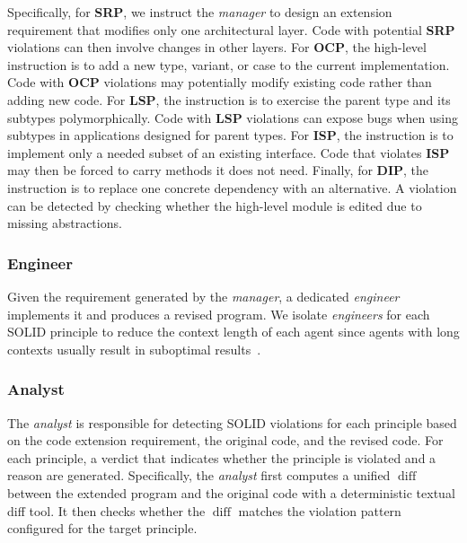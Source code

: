 \documentclass[sigconf,screen]{acmart}
\begin{document}
Specifically, for \textbf{SRP}, we instruct the \textit{manager} to design an extension requirement that modifies only one architectural layer.
Code with potential \textbf{SRP} violations can then involve changes in other layers.
For \textbf{OCP}, the high-level instruction is to add a new type, variant, or case to the current implementation.
Code with \textbf{OCP} violations may potentially modify existing code rather than adding new code.
For \textbf{LSP}, the instruction is to exercise the parent type and its subtypes polymorphically.
Code with \textbf{LSP} violations can expose bugs when using subtypes in applications designed for parent types.
For \textbf{ISP}, the instruction is to implement only a needed subset of an existing interface.
Code that violates \textbf{ISP} may then be forced to carry methods it does not need.
Finally, for \textbf{DIP}, the instruction is to replace one concrete dependency with an alternative.
A violation can be detected by checking whether the high-level module is edited due to missing abstractions.

\subsubsection{Engineer}
Given the requirement generated by the \textit{manager}, a dedicated \textit{engineer} implements it and produces a revised program. 
We isolate \textit{engineers} for each SOLID principle to reduce the context length of each agent since agents with long contexts usually result in suboptimal results~\cite{Levy2024SameTask}.

\subsubsection{Analyst}
The \textit{analyst} is responsible for detecting SOLID violations for each principle based on the code extension requirement, the original code, and the revised code.
For each principle, a verdict that indicates whether the principle is violated and a reason are generated.
Specifically, the \textit{analyst} first computes a unified $\operatorname{diff}$ between the extended program and the original code with a deterministic textual diff tool.
It then checks whether the $\operatorname{diff}$ matches the violation pattern configured for the target principle.
\end{document}
